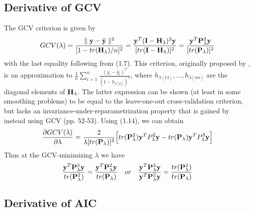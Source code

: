 \documentclass[11pt]{article}
\begin{document}
\subsection{\textbf{Derivative of GCV}}
The GCV criterion is given by
\begin{align*}
GCV(\lambda)=\frac{\parallel {\bf y}-\hat{{\bf y}}\parallel ^2}{[1-tr({\bf H}_\lambda)/n]^2}=\frac{{\bf y}^T ({\bf I}-{\bf H}_\lambda)^2{\bf y}}{[tr({\bf I}-{\bf H}_\lambda)]^2}=\frac{{\bf y}^T {\bf P}_\lambda^2{\bf y}}{[tr({\bf P}_\lambda)]^2}
\end{align*}
with the last equality following from (1.7). This criterion, originally proposed by \citep{craven_smoothing_1979}, is an approximation to $\frac{1}{n}\sum_{i=1}^n \frac{(y_i-\hat{y}_i)^2}{(1-h_{\lambda [ii]})^2}$, where $h_{\lambda [11]},...,h_{\lambda [nn]}$ are the diagonal elements of ${\bf H}_\lambda$. The latter expression can be shown (at least in some smoothing problems) to be equal to the leave-one-out cross-validation criterion, but lacks an invariance-under-reparametrization property that is gained by instead using GCV \citep{wahba_spline_1990}(pp. 52-53). Using (1.14), we can obtain
\begin{align}
\frac{\partial GCV(\lambda)}{\partial \lambda}=\frac{2}{\lambda [tr({\bf P}_\lambda)]^3}\Big[tr({\bf P}_\lambda^2){\bf y}^T P_\lambda^2{\bf y}-tr({\bf P}_\lambda){\bf y}^T P_\lambda^3{\bf y} \Big]
\end{align}
Thus at the GCV-minimizing $\lambda$ we have
\begin{align*}
\frac{{\bf y}^T {\bf P}_\lambda^3{\bf y}}{tr({\bf P}_\lambda^2)}=\frac{{\bf y}^T {\bf P}_\lambda^2{\bf y}}{tr({\bf P}_\lambda)}\quad or\quad \frac{{\bf y}^T {\bf P}_\lambda^3{\bf y}}{{\bf y}^T {\bf P}_\lambda^2{\bf y}}=\frac{tr({\bf P}_\lambda^2)}{tr({\bf P}_\lambda)}
\end{align*}

\subsection{\textbf{Derivative of AIC}}
\begin{comment}
According to (2.1.5), Akaike's Information Criterion (AIC) chooses $\lambda$ by minimizing,
\begin{align*}
AIC=2(p+2)+n log[\frac{1}{n}(\by-\bmu)^T(\bI_n-\bA_\lambda)^2(\by-\bmu)]+n+n log(2\pi)
\end{align*}
For given $\lambda$, the value of $\mu$ minimizing this expression is the generalized least square fit $\hat{\mu}_\lambda=[\mathbf{1}^T(\bI_n-\bA_\lambda)^2\mathbf{1}]^{-1}\mathbf{1}^T(\bI_n-\bA_\lambda)^2\by=(\mathbf{1}^T\bV_\lambda^{-2}\mathbf{1})^{-1}\mathbf{1}^T\bV_\lambda^{-2}\by$.\\

Ignoring an additive constant leads to the objective function
\end{comment}
\end{document}
